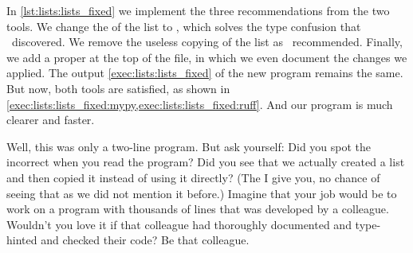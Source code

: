 %
%
%
In \cref{lst:lists:lists_fixed} we implement the three recommendations from the two tools.
We change the  of the list to , which solves the type confusion that \mypy\ discovered.
We remove the useless copying of the list as \ruff\ recommended.
Finally, we add a proper  at the top of the file, in which we even document the changes we applied.
The output \cref{exec:lists:lists_fixed} of the new program remains the same.
But now, both tools are satisfied, as shown in \cref{exec:lists:lists_fixed:mypy,exec:lists:lists_fixed:ruff}.
And our program is much clearer and faster.%
%
%
%
\FloatBarrier%
%
%
%

Well, this was only a two-line program.
But ask yourself:
Did you spot the incorrect  when you read the program?
Did you see that we actually created a list and then copied it instead of using it directly?
(The  I give you, no chance of seeing that as we did not mention it before.)
Imagine that your job would be to work on a program with thousands of lines that was developed by a colleague.
Wouldn't you love it if that colleague had thoroughly documented and type-hinted and checked their code?
Be that colleague.%
%
\FloatBarrier%
\endhsection%
\endhsection%
%
